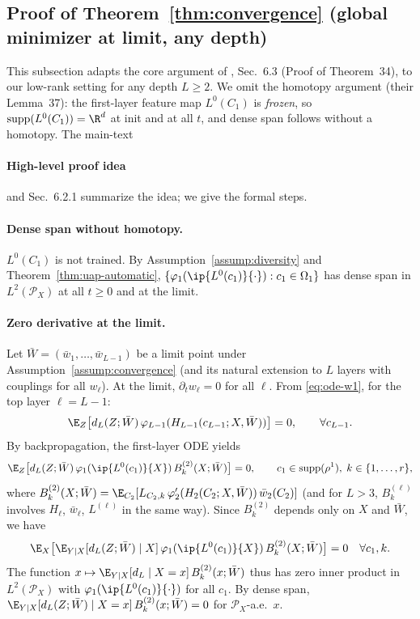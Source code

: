 \documentclass[nohyperref]{article}
\theoremstyle{plain}
\theoremstyle{definition}
\theoremstyle{remark}
\begin{document}
\subsection{Proof of Theorem~\ref{thm:convergence} (global minimizer at limit, any depth)}
\label{app:proof-thm-convergence}

This subsection adapts the core argument of \cite{nguyen2023rigorousframeworkmeanfield}, Sec.~6.3 (Proof of Theorem~34), to our low-rank setting for any depth $L\ge 2$. We omit the homotopy argument (their Lemma~37): the first-layer feature map $L^0(C_1)$ is \emph{frozen}, so $\text{supp}(L^0(C_1))=\R^d$ at init and at all $t$, and dense span follows without a homotopy. The main-text \paragraph{High-level proof idea} and \cite{nguyen2023rigorousframeworkmeanfield} Sec.~6.2.1 summarize the idea; we give the formal steps.

\paragraph{Dense span without homotopy.}
$L^0(C_1)$ is not trained. By Assumption~\ref{assump:diversity} and Theorem~\ref{thm:uap-automatic}, $\{\varphi_1(\ip{L^0(c_1)}{\cdot}): c_1\in\Omega_1\}$ has dense span in $L^2(\mathcal{P}_X)$ at all $t\ge 0$ and at the limit.

\paragraph{Zero derivative at the limit.}
Let $\bar W=(\bar{w}_1,\ldots,\bar{w}_{L-1})$ be a limit point under Assumption~\ref{assump:convergence} (and its natural extension to $L$ layers with couplings for all $w_\ell$). At the limit, $\partial_t w_\ell=0$ for all $\ell$. From \eqref{eq:ode-w1}, for the top layer $\ell=L-1$:
\[
\E_Z\bigl[d_L(Z;\bar W)\,\varphi_{L-1}(H_{L-1}(c_{L-1};X,\bar W))\bigr]=0,\qquad \forall c_{L-1}.
\]
By backpropagation, the first-layer ODE yields
\[
\E_Z\bigl[d_L(Z;\bar W)\,\varphi_1(\ip{L^0(c_1)}{X})\,B_k^{(2)}(X;\bar W)\bigr]=0,\qquad c_1\in\text{supp}(\rho^1),\; k\in\{1,\ldots,r\},
\]
where $B_k^{(2)}(X;\bar W)=\E_{C_2}[L_{C_2,k}\,\varphi_2'(H_2(C_2;X,\bar W))\,\bar{w}_2(C_2)]$ (and for $L>3$, $B_k^{(\ell)}$ involves $H_\ell$, $\bar{w}_\ell$, $L^{(\ell)}$ in the same way). Since $B_k^{(2)}$ depends only on $X$ and $\bar W$, we have
\[
\E_X\bigl[\E_{Y|X}[d_L(Z;\bar W)\mid X]\,\varphi_1(\ip{L^0(c_1)}{X})\,B_k^{(2)}(X;\bar W)\bigr]=0\quad \forall c_1,k.
\]
The function $x\mapsto \E_{Y|X}[d_L\mid X=x]\,B_k^{(2)}(x;\bar W)$ thus has zero inner product in $L^2(\mathcal{P}_X)$ with $\varphi_1(\ip{L^0(c_1)}{\cdot})$ for all $c_1$. By dense span, $\E_{Y|X}[d_L(Z;\bar W)\mid X=x]\,B_k^{(2)}(x;\bar W)=0$ for $\mathcal{P}_X$-a.e.\ $x$.
\end{document}
